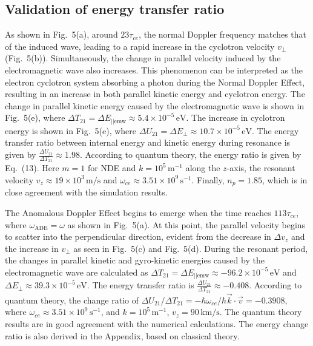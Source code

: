 \documentclass{cpbtex}
\begin{document}
\begin{CJK*}{GBK}{song}
\subsection{Validation of energy transfer ratio  }

As shown in Fig.~5(a), around \( 23\tau_{ce} \), the normal Doppler frequency matches that of the induced wave, leading to a rapid increase in the cyclotron velocity \( v_{\perp} \) (Fig.~5(b)). Simultaneously, the change in parallel velocity induced by the electromagnetic wave also increases. This phenomenon can be interpreted as the electron cyclotron system absorbing a photon during the Normal Doppler Effect, resulting in an increase in both parallel kinetic energy and cyclotron energy. The change in parallel kinetic energy caused by the electromagnetic wave is shown in Fig.~5(e), where \( \Delta T_{21} = \Delta E_{||\text{emw}} \approx 5.4 \times 10^{-5} \, \text{eV} \). The increase in cyclotron energy is shown in Fig.~5(e), where \( \Delta U_{21} = \Delta E_{\perp} \approx 10.7 \times 10^{-5} \, \text{eV} \). The energy transfer ratio between internal energy and kinetic energy during resonance is given by \( \frac{\Delta U_{21}}{\Delta T_{21}} \approx 1.98 \). According to quantum theory, the energy ratio is given by Eq.~(13). Here \( m = 1 \) for NDE and \( k = 10^5 \, \text{m}^{-1} \) along the \( z \)-axis, the resonant velocity \( v_z \approx 19 \times 10^3 \, \text{m/s} \) and \( \omega_{ce} \approx 3.51 \times 10^9 \, \text{s}^{-1} \). Finally, \( n_p = 1.85 \), which is in close agreement with the simulation results.

The Anomalous Doppler Effect begins to emerge when the time reaches \( 113 \tau_{ce} \), where \( \omega_{\text{ADE}} = \omega \) as shown in Fig.~5(a). At this point, the parallel velocity begins to scatter into the perpendicular direction, evident from the decrease in \( \Delta v_z \) and the increase in \( v_{\perp} \) as seen in Fig.~5(c) and Fig.~5(d). During the resonant period, the changes in parallel kinetic and gyro-kinetic energies caused by the electromagnetic wave are calculated as \( \Delta T_{21} = \Delta E_{||\text{emw}} \approx -96.2 \times 10^{-5} \, \text{eV} \) and \( \Delta E_{\perp} \approx 39.3 \times 10^{-5} \, \text{eV} \). The energy transfer ratio is \( \frac{\Delta U_{21}}{\Delta T_{21}} \approx -0.408 \). According to quantum theory, the change ratio of \( \Delta U_{21}/\Delta T_{21} = -\hbar \omega_{ce}/\hbar \vec{k} \cdot \vec{v} = -0.3908 \), where \( \omega_{ce} \approx 3.51 \times 10^9 \, \text{s}^{-1} \), and \( k = 10^5 \, \text{m}^{-1} \), \( v_z = 90 \, \text{km/s} \). The quantum theory results are in good agreement with the numerical calculations. The energy change ratio is also derived in the Appendix, based on classical theory.

\end{CJK*}
\end{document}

